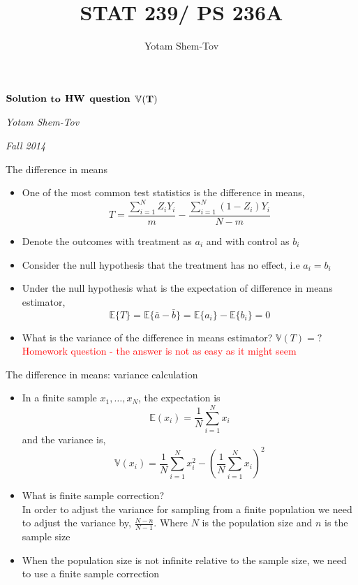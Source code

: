 \documentclass{beamer}
\author{Yotam Shem-Tov}
\title{STAT 239/ PS 236A}
\theoremstyle{definition}
\begin{document}


\begin{frame}{}

\centering

\LARGE

 $\bold{Solution}$ $\bold{to}$ $\bold{HW}$ $\bold{question}$ $\bold{\mathbb{V}(T)}$ 

\vspace{0.4 in}

\large
\textit{Yotam Shem-Tov}

\vspace{0.1 in}

\textit{Fall 2014}

\end{frame}




\begin{frame}{The difference in means}
\begin{itemize}
\item One of the most common test statistics is the difference in means,
$$ T =\frac{\sum_{i=1}^N Z_i Y_i}{m} - \frac{\sum_{i=1}^N (1-Z_i) Y_i}{N-m}$$
\item Denote the outcomes with treatment as $a_i$ and with control as $b_i$
\item Consider the null hypothesis that the treatment has no effect, i.e $a_i=b_i$
\item Under the null hypothesis what is the expectation of difference in means estimator,
$$  \mathbb{E}\lbrace T \rbrace= \mathbb{E}\lbrace \bar{a} - \bar{b} \rbrace  = 
\mathbb{E}\lbrace a_i \rbrace - \mathbb{E}\lbrace b_i \rbrace = 0$$
\item What is the variance of the difference in means estimator? $\mathbb{V}(T)=?$ 
\pause \textcolor{red}{Homework question - the answer is not as easy as it might seem}
\end{itemize}
\end{frame}

\begin{frame}{The difference in means: variance calculation}
\begin{itemize}
\item In a finite sample $x_1,\dots,x_N$, the expectation is 
$$\mathbb{E}(x_i) = \frac{1}{N} \sum_{i=1}^N x_i$$
and the variance is,
$$\mathbb{V}(x_i) = \frac{1}{N} \sum_{i=1}^N x_i^2 - \left( \frac{1}{N} \sum_{i=1}^N x_i \right)^2$$
\item What is finite sample correction? \pause\\
In order to adjust the variance for sampling from a finite population we need to adjust the variance by, $\frac{N-n}{N-1}$. Where $N$ is the population size and $n$ is the sample size
\item When the population size is not infinite relative to the sample size, we need to use a finite sample correction  
\end{itemize}
\end{frame}
\end{document}
